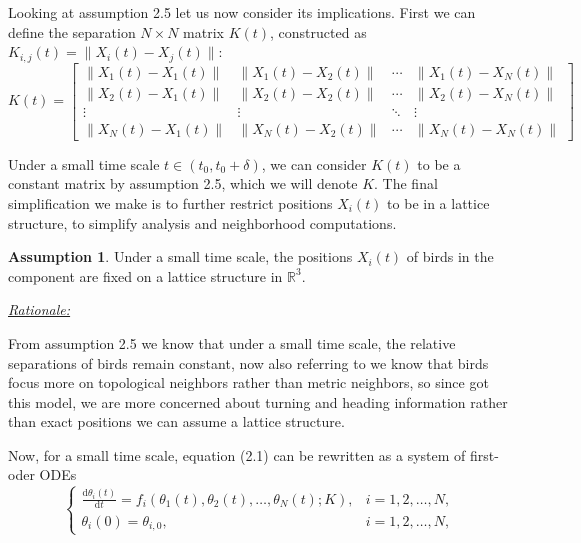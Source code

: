 \documentclass[11pt,a4paper]{article}
\numberwithin{equation}{section}
\newcommand{\R}{\mathbb{R}}
\theoremstyle{definition}
\theoremstyle{assumption}
\newtheorem{assumption}[theorem]{Assumption}
\newenvironment{rationale}{%
  \par\vspace{0.5em}
  \noindent\hspace{1em}\begin{minipage}{\dimexpr\linewidth-2em}
  \underline{\textit{Rationale:}} 
}{%
  \end{minipage}
  \par\vspace{0.5em}
}
\begin{document}
Looking at assumption 2.5 let us now consider its implications. First 
we can define the separation $N \times N$ matrix $K(t)$, constructed as \(K_{i,j}(t) = \|X_i(t) - X_j(t)\|\):
\begin{equation}
    K(t) = 
    \begin{bmatrix}
    \|X_1(t) - X_1(t)\| & \|X_1(t) - X_2(t)\| & \cdots & \|X_1(t) - X_N(t)\| \\
    \|X_2(t) - X_1(t)\| & \|X_2(t) - X_2(t)\| & \cdots & \|X_2(t) - X_N(t)\| \\
    \vdots & \vdots & \ddots & \vdots \\
    \|X_N(t) - X_1(t)\| & \|X_N(t) - X_2(t)\| & \cdots & \|X_N(t) - X_N(t)\|
    \end{bmatrix}
\end{equation}

Under a small time scale $t\in(t_0,t_0+\delta)$, we can consider $K(t)$ to be a constant matrix by assumption 2.5, which we
will denote $K$. The final simplification we make is to further restrict positions $X_i(t)$ to be in a lattice structure, 
to simplify analysis and neighborhood computations.

\begin{assumption}
    Under a small time scale, the positions $X_i(t)$ of birds in the component are fixed on a lattice structure in $\R^3$.
    \begin{rationale}
        From assumption 2.5 we know that under a small time scale, the relative separations of birds remain constant,
        now also referring to \cite{ballerini2008interaction} we know that birds
        focus more on topological neighbors rather than metric neighbors, so since 
        got this model, we are more concerned about turning and heading information rather than exact positions
        we can assume a lattice structure.
    \end{rationale}
\end{assumption}


Now, for a small time scale, equation (2.1) can be rewritten as a system of first-oder ODEs
\begin{equation}
    \begin{cases}
    \displaystyle \frac{\mathrm{d}\theta_i(t)}{\mathrm{d}t} = f_i(\theta_1(t), \theta_2(t), \ldots, \theta_N(t); K), & i=1,2,\ldots,N,\\[6pt]
    \theta_i(0) = \theta_{i,0}, & i=1,2,\ldots,N,
    \end{cases}
\end{equation}
\end{document}
